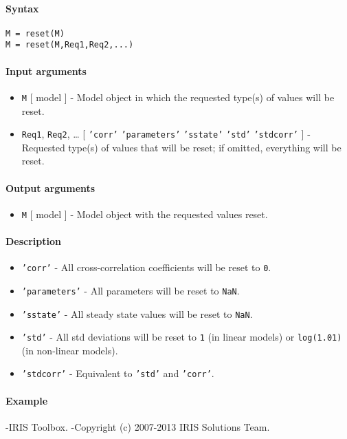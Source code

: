


	\paragraph{Syntax}\label{syntax}

\begin{verbatim}
M = reset(M)
M = reset(M,Req1,Req2,...)
\end{verbatim}

\paragraph{Input arguments}\label{input-arguments}

\begin{itemize}
\item
  \texttt{M} {[} model {]} - Model object in which the requested type(s)
  of values will be reset.
\item
  \texttt{Req1}, \texttt{Req2}, \ldots{} {[} \texttt{'corr'} \textbar{}
  \texttt{'parameters'} \textbar{} \texttt{'sstate'} \textbar{}
  \texttt{'std'} \textbar{} \texttt{'stdcorr'} {]} - Requested type(s)
  of values that will be reset; if omitted, everything will be reset.
\end{itemize}

\paragraph{Output arguments}\label{output-arguments}

\begin{itemize}
\itemsep1pt\parskip0pt
\item
  \texttt{M} {[} model {]} - Model object with the requested values
  reset.
\end{itemize}

\paragraph{Description}\label{description}

\begin{itemize}
\item
  \texttt{'corr'} - All cross-correlation coefficients will be reset to
  \texttt{0}.
\item
  \texttt{'parameters'} - All parameters will be reset to \texttt{NaN}.
\item
  \texttt{'sstate'} - All steady state values will be reset to
  \texttt{NaN}.
\item
  \texttt{'std'} - All std deviations will be reset to \texttt{1} (in
  linear models) or \texttt{log(1.01)} (in non-linear models).
\item
  \texttt{'stdcorr'} - Equivalent to \texttt{'std'} and \texttt{'corr'}.
\end{itemize}

\paragraph{Example}\label{example}

-IRIS Toolbox. -Copyright (c) 2007-2013 IRIS Solutions Team.


